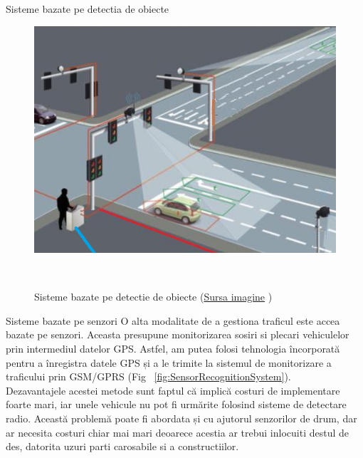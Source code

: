 \documentclass{beamer}
\begin{document}
    \begin{frame}{Sisteme bazate pe detectia de obiecte }
        \begin{figure}[h!]
            \includegraphics[width=(\textwidth / 4) * 3]{ObjectRecognitionSystemRepresentation.png}
            \caption{Sisteme bazate pe detectie de obiecte  
            (\href{https://english.mathrubhumi.com/news/kerala/knowing-traffic-camera-locations-isn-t-enough-to-escape-from-them-mvd-can-move-them-easily-1.7427787}{Sursa imagine} \textcopyright)}
            \label{fig:ObjectRecognitionSystem}
        \end{figure}

    \end{frame}

    \begin{frame}{Sisteme bazate pe senzori}
        O alta modalitate de a gestiona traficul este accea bazate pe senzori. 
        Aceasta presupune monitorizarea sosiri si plecari vehiculelor prin 
        intermediul datelor GPS.
        Astfel, am putea folosi tehnologia încorporată pentru a înregistra datele GPS și a le trimite
        la sistemul de monitorizare a traficului prin GSM/GPRS (Fig ~\ref{fig:SensorRecognitionSystem}). \\
        Dezavantajele acestei metode sunt faptul că implică costuri de implementare foarte mari, iar
        unele vehicule nu pot fi urmărite folosind sisteme de detectare radio.
        Această problemă poate fi abordata și cu ajutorul senzorilor de drum, dar ar necesita
        costuri chiar mai mari deoarece acestia ar trebui inlocuiti destul de des, 
        datorita uzuri parti carosabile si a constructiilor.
    \end{frame}
\end{document}
